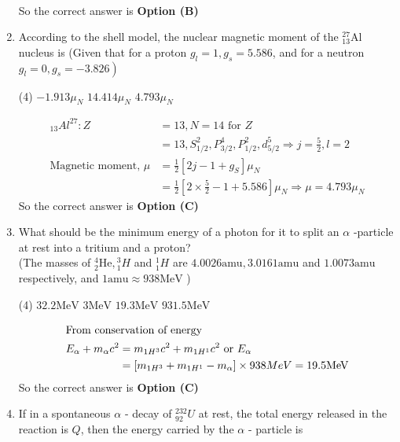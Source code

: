 \begin{enumerate}
\begin{answer}
\begin{align*}
\end{align*}
So the correct answer is \textbf{Option (B)}
\end{answer}
\item 	According to the shell model, the nuclear magnetic moment of the ${ }_{13}^{27} \mathrm{Al}$ nucleus is (Given that for a proton $g_{l}=1, g_{s}=5.586$, and for a neutron $\left.g_{l}=0, g_{s}=-3.826\right)$
{}
\begin{tasks}(4)
\task[\textbf{A.}] $-1.913 \mu_{N}$
\task[\textbf{B.}] $14.414 \mu_{N}$
\task[\textbf{C.}] $4.793 \mu_{N}$
\end{tasks}
\begin{answer}
\begin{align*}
{ }_{13} A l^{27}: Z&=13, N=14\text{ for }Z\\&=13, S_{1 / 2}^{2}, P_{3 / 2}^{4}, P_{1 / 2}^{2}, d_{5 / 2}^{5} \Rightarrow j=\frac{5}{2}, l=2\\
\text{Magnetic moment, }\mu&=\frac{1}{2}\left[2 j-1+g_{S}\right] \mu_{N}\\&=\frac{1}{2}\left[2 \times \frac{5}{2}-1+5.586\right] \mu_{N} \Rightarrow \mu=4.793 \mu_{N}
\end{align*}
So the correct answer is \textbf{Option (C)}
\end{answer}
	\item What should be the minimum energy of a photon for it to split an $\alpha$ -particle at rest into a tritium and a proton?\\
	(The masses of ${ }_{2}^{4} \mathrm{He},{ }_{1}^{3} H$ and ${ }_{1}^{1} H$ are $4.0026 \mathrm{amu}, 3.0161 \mathrm{amu}$ and $1.0073 \mathrm{amu}$ respectively, and $1 \mathrm{amu} \approx 938 \mathrm{MeV}$ )
{	}
\begin{tasks}(4)
\task[\textbf{A.}] $32.2 \mathrm{MeV}$
\task[\textbf{B.}] $3 \mathrm{MeV}$
\task[\textbf{C.}] $19.3 \mathrm{MeV}$
\task[\textbf{D.}] $931.5 \mathrm{MeV}$
\end{tasks}
\begin{answer}
\begin{align*}
\intertext{From conservation of energy}
E_{\alpha}+m_{\alpha} c^{2}&=m_{1 H^{3}} c^{2}+m_{1 H^{1}} c^{2}\text{ or } E_{\alpha}\\&=\left[m_{1 H^{3}}+m_{1 H^{1}}-m_{\alpha}\right] \times 938 M e V=19.5 \mathrm{MeV}
\end{align*}
So the correct answer is \textbf{Option (C)}
\end{answer}
\item 	If in a spontaneous $\alpha$ - decay of ${ }_{92}^{232} U$ at rest, the total energy released in the reaction is $Q$, then the energy carried by the $\alpha$ - particle is

\end{enumerate}
